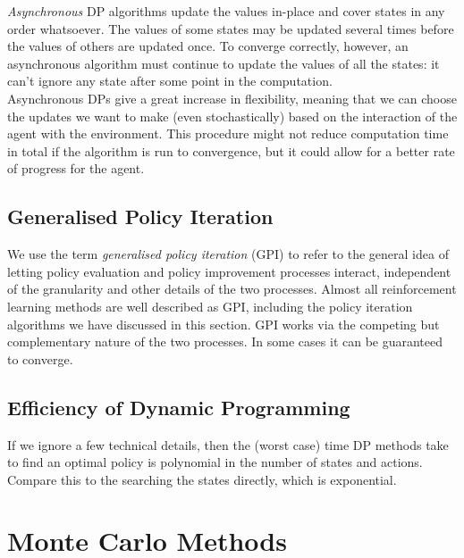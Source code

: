 \emph{Asynchronous} DP algorithms update the values in-place and cover states in any order whatsoever. The values of some states may be updated several times before the values of others are updated once. To converge correctly, however, an asynchronous algorithm must continue to update the values of all the states: it can’t ignore any state after some point in the computation.\\

Asynchronous DPs give a great increase in flexibility, meaning that we can choose the updates we want to make (even stochastically) based on the interaction of the agent with the environment. This procedure might not reduce computation time in total if the algorithm is run to convergence, but it could allow for a better rate of progress for the agent.

\subsection{Generalised Policy Iteration}
We use the term \emph{generalised policy iteration} (GPI) to refer to the general idea of letting policy evaluation and policy improvement processes interact, independent of the granularity and other details of the two processes. Almost all reinforcement learning methods are well described as GPI, including the policy iteration algorithms we have discussed in this section. GPI works via the competing but complementary nature of the two processes. In some cases it can be guaranteed to converge. 

\subsection{Efficiency of Dynamic Programming}
If we ignore a few technical details, then the (worst case) time DP methods take to find an optimal policy is polynomial in the number of states and actions. Compare this to the searching the states directly, which is exponential.


\clearpage
\section{Monte Carlo Methods}
